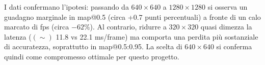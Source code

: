 \documentclass[12pt,a4paper,openright,twoside]{book}
\begin{document}

I dati confermano l'ipotesi: passando da $640\times640$ a $1280\times1280$ si osserva un guadagno marginale in 
\ac{map}@0.5 (circa +0.7 punti percentuali) a fronte di un calo marcato di \ac{fps} (circa $-62\%$). 
Al contrario, ridurre a $320\times320$ quasi dimezza la latenza ($(\sim)$ 11.8 vs 22.1 ms/frame) 
ma comporta una perdita più sostanziale di accuratezza, soprattutto in \ac{map}@0.5:0.95. 
La scelta di $640\times640$ si conferma quindi come compromesso ottimale per questo progetto.



\begin{table}[h]
  \centering
  \caption{Performance del detector al variare della risoluzione di input. L'accuratezza (\ac{map}) cresce con la risoluzione, 
  a discapito della velocità (\ac{fps}).}
  \label{tab:ablation_resolution}
\end{table}
\end{document}

